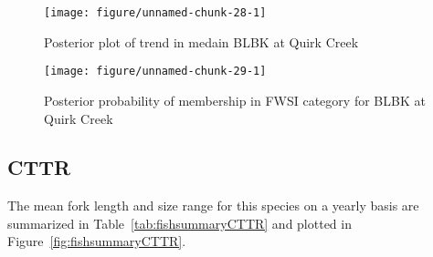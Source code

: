 \documentclass[]{article}\usepackage[]{graphicx}\usepackage[]{color}
\makeatletter
\def\maxwidth{ %
  \ifdim\Gin@nat@width>\linewidth
    \linewidth
  \else
    \Gin@nat@width
  \fi
}
\newenvironment{knitrout}{}{} %
\makeatother
\begin{document}
\begin{figure}[h]
\begin{center}
\begin{knitrout}
\color{fgcolor}
\texttt{[image: figure/unnamed-chunk-28-1]} 

\end{knitrout}
\end{center}
\caption{Posterior plot of trend in medain BLBK at Quirk Creek}
\label{fig:postplotBLBK}
\end{figure}

\begin{figure}[h]
\begin{center}
\begin{knitrout}
\color{fgcolor}
\texttt{[image: figure/unnamed-chunk-29-1]} 

\end{knitrout}
\end{center}
\caption{Posterior probability of membership in FWSI category for  BLBK at Quirk Creek}
\label{fig:fsiplotBLBK}
\end{figure}






\clearpage %
\subsection{ CTTR}



The  mean fork length and size range for this species on a yearly basis are summarized in 
Table~\ref{tab:fishsummaryCTTR} 
and plotted in 
Figure~\ref{fig:fishsummaryCTTR}.
\end{document}

